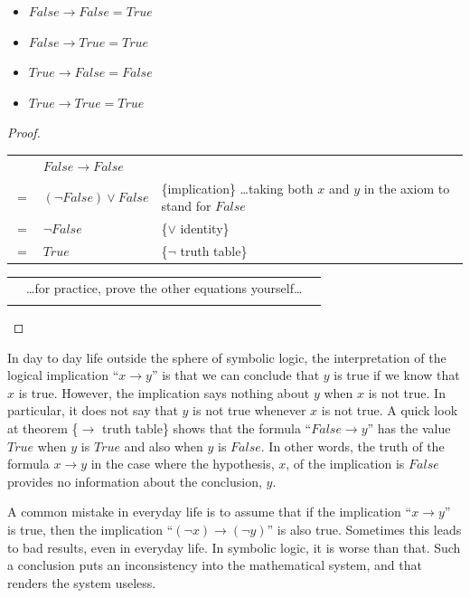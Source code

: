 \begin{theorem}
\label{implication-truth-table}
\mbox{}
\begin{itemize}
\item $False \rightarrow False = True$
\item $False \rightarrow True  = True$
\item $True  \rightarrow False = False$
\item $True  \rightarrow True  = True$
\end{itemize}
\end{theorem}

\begin{proof}
\mbox{} \\
\begin{tabular}{llp{3.15in}}
    & $False \rightarrow False$        & \\
$=$ & $(\neg False) \vee False$        & \{implication\} \dots taking both $x$ and $y$ in the axiom to stand for $False$ \\
$=$ & $\neg False$                     & \{$\vee$ identity\}\\
$=$ & $True$                           & \{$\neg$ truth table\}\\
\end{tabular}

\begin{tabular}{lll}
& \dots for practice, prove the other equations yourself\dots & \\         & \\
\end{tabular}

\end{proof}

In day to day life outside the sphere of symbolic logic,
the interpretation of the logical implication ``$x \rightarrow y$''
is that we can conclude that $y$ is true if we know that
$x$ is true. However, the implication says nothing
about $y$ when $x$ is not true. In particular, it
does not say that $y$ is not true whenever $x$ is not true.
A quick look at theorem \{$\rightarrow$ truth table\} shows that the
formula ``$False \rightarrow y$'' has the value $True$ when $y$ is $True$
and also when $y$ is $False$.
In other words, the truth of the formula $x \rightarrow y$ in the case
where the hypothesis, $x$, of the implication is $False$ provides
no information about the conclusion, $y$.

A common mistake in everyday life is to assume that if the
implication ``$x \rightarrow y$'' is true, then the implication
``$(\neg x) \rightarrow (\neg y)$''
is also true. Sometimes this leads to bad
results, even in everyday life. In symbolic logic,
it is worse than that. Such a conclusion puts an
inconsistency into the mathematical system, and that renders the system useless.

